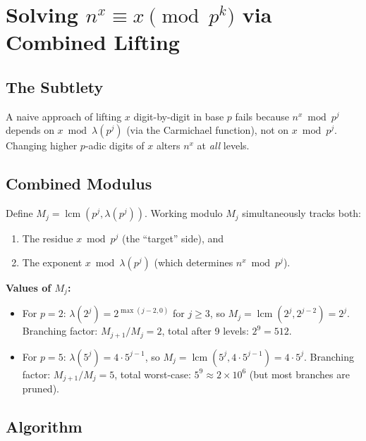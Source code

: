 \documentclass[11pt]{article}
\begin{document}
\section{Solving $n^x \equiv x \pmod{p^k}$ via Combined Lifting}

\subsection{The Subtlety}

A naive approach of lifting $x$ digit-by-digit in base $p$ fails because
$n^x \bmod p^j$ depends on $x \bmod \lambda(p^j)$ (via the Carmichael function),
not on $x \bmod p^j$. Changing higher $p$-adic digits of $x$ alters $n^x$ at
\emph{all} levels.

\subsection{Combined Modulus}

Define $M_j = \operatorname{lcm}(p^j, \lambda(p^j))$. Working modulo $M_j$
simultaneously tracks both:
\begin{enumerate}
    \item The residue $x \bmod p^j$ (the ``target'' side), and
    \item The exponent $x \bmod \lambda(p^j)$ (which determines $n^x \bmod p^j$).
\end{enumerate}

\textbf{Values of $M_j$:}
\begin{itemize}
    \item For $p = 2$: $\lambda(2^j) = 2^{\max(j-2,0)}$ for $j \geq 3$, so
    $M_j = \operatorname{lcm}(2^j, 2^{j-2}) = 2^j$.
    Branching factor: $M_{j+1}/M_j = 2$, total after 9 levels: $2^9 = 512$.

    \item For $p = 5$: $\lambda(5^j) = 4 \cdot 5^{j-1}$, so
    $M_j = \operatorname{lcm}(5^j, 4 \cdot 5^{j-1}) = 4 \cdot 5^j$.
    Branching factor: $M_{j+1}/M_j = 5$, total worst-case: $5^9 \approx 2 \times 10^6$
    (but most branches are pruned).
\end{itemize}

\subsection{Algorithm}
\end{document}
